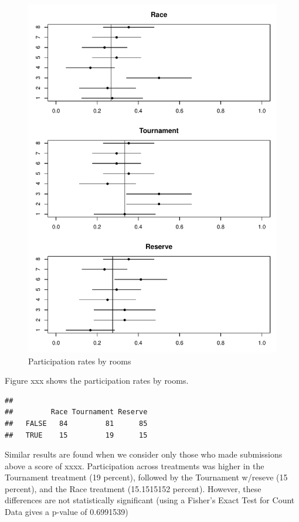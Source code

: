 \documentclass[12pt,]{article}
\theoremstyle{plain} %
\begin{document}
\begin{figure}
\centering
\includegraphics{Figures/unnamed-chunk-10-1.pdf}
\caption{Participation rates by rooms}
\end{figure}

Figure xxx shows the participation rates by rooms.

\begin{verbatim}
##        
##         Race Tournament Reserve
##   FALSE   84         81      85
##   TRUE    15         19      15
\end{verbatim}

Similar results are found when we consider only those who made
submissions above a score of xxxx. Participation across treatments was
higher in the Tournament treatment (19 percent), followed by the
Tournament w/reseve (15 percent), and the Race treatment (15.1515152
percent). However, these differences are not statistically significant
(using a Fisher's Exact Test for Count Data gives a p-value of
0.6991539)
\end{document}
